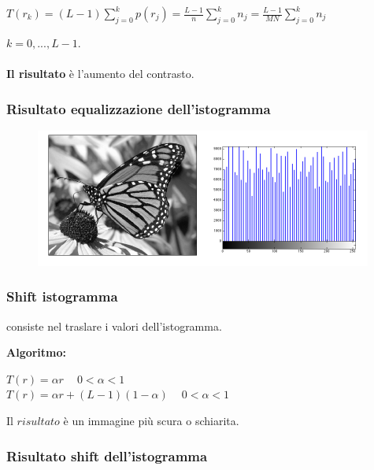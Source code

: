 \begin{center}
    $T(r_k) = (L-1)\sum_{j=0}^{k}p(r_j)=\frac{L-1}{n} \sum_{j=0}^{k}n_j = \frac{L-1}{MN}\sum_{j=0}^{k}n_j$
\end{center}

$k=0,...,L-1$.
\\\\
\textbf{Il risultato} è l'aumento del contrasto.

\subsubsection{Risultato equalizzazione dell'istogramma}

\begin{figure}[H]
    \centering
    \includegraphics[width=\linewidth, keepaspectratio]{capitoli/immagini/imgs/eq-istogramma.png}
\end{figure}

\subsubsection{Shift istogramma}

\begin{definition}
    consiste nel traslare i valori dell’istogramma.
\end{definition}
\textbf{Algoritmo:}

\begin{center}
    $T(r) = \alpha r$  $ \ \ \ \  0 < \alpha < 1$
    \\
    $T(r) = \alpha r + (L-1)(1-\alpha)$ $\ \ \ \ 0<\alpha<1$
\end{center}

Il $risultato$ è un immagine più scura o schiarita.

\subsubsection{Risultato shift dell'istogramma}

